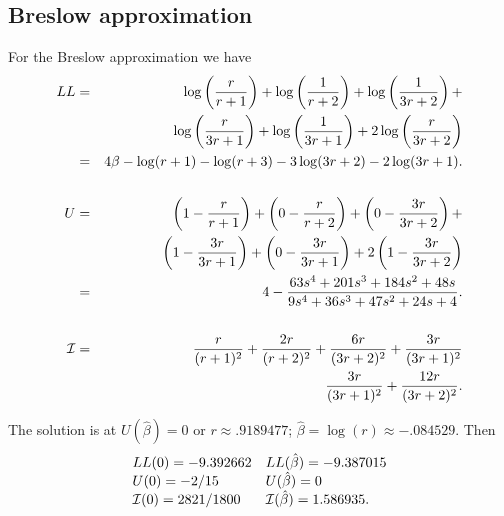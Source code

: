 \documentclass[11pt]{article}
\def\bhat{\hat \beta}        %
\def\imat{{\cal I}}
\begin{document}
\subsection{Breslow approximation}
For the Breslow approximation we have
\begin{eqnarray*}
LL &=&   \log\left(\frac{r}{r+1}\right)
	+\log\left(\frac{1}{r+2}\right)
	+\log\left(\frac{1}{3r+2}\right) +\\
    &&	\log\left(\frac{r}{3r+1}\right)
	+\log\left(\frac{1}{3r+1}\right)
	+2\log\left(\frac{r}{3r+2}\right)  \\
   &=& 4\beta - \log(r+1) - \log(r+3)- 3\log(3r+2) -2\log(3r+1). \\ \\
U &=& \left(1-\frac{r}{r+1}\right) + \left(0-\frac{r}{r+2}\right) 
	+ \left(0-\frac{3r}{3r+2}\right) + \\
    &&	 \left(1-\frac{3r}{3r+1}\right) + 
	 \left(0-\frac{3r}{3r+1}\right) + 
	 2\left(1-\frac{3r}{3r+2}\right) \\
  &=& 4-\frac{63s^4 + 201s^3 + 184s^2 + 48s}{9s^4 + 36s^3 +47s^2 + 24s +4}.
		\\ \\
\imat &=&  \frac{r}{(r+1)^2} + \frac{2r}{(r+2)^2} +
   	\frac{6r}{(3r+2)^2} + \frac{3r}{(3r+1)^2} \\
      && \frac{3r}{(3r+1)^2} + \frac{12r}{(3r+2)^2} . \\
\end{eqnarray*}

The solution is at $U(\bhat)=0$ or $r \approx .9189477$;
$\bhat = \log(r) \approx -.084529$.
Then
$$
\begin{array}{ll}
 LL(0)=-9.392662 & LL(\bhat)=-9.387015 \\
 U(0) = -2/15 & U(\bhat) = 0 \\
 \imat(0) = 2821/1800  & \imat(\bhat) = 1.586935.
\end{array}
$$
\end{document}
